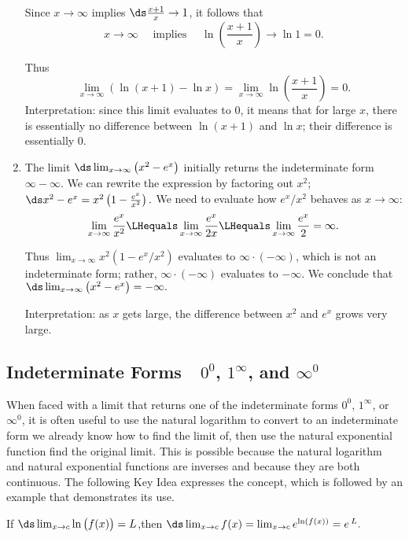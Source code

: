 \begin{example}
\begin{enumerate}
Since $x\to\infty$ implies $\ds\frac{x+1}x\to 1$, it follows that 
\[x\to\infty \quad \text{ implies }\quad \ln\left(\frac{x+1}x\right)\to\ln 1=0.\]

Thus
\[
 \lim_{x\to\infty} \left(\ln(x+1)-\ln x\right)
 = \lim_{x\to \infty} \ln \left(\frac{x+1}x\right)=0.
\]
Interpretation: since this limit evaluates to 0, it means that for large $x$, there is essentially no difference between $\ln (x+1)$ and $\ln x$; their difference is essentially 0.

	\item	The limit $\ds \lim_{x\to\infty} \left(x^2-e^x\right)$ initially returns the indeterminate form $\infty-\infty$. We can rewrite the expression by factoring out $x^2$; $\ds x^2-e^x = x^2\left(1-\frac{e^x}{x^2}\right).$ We need to evaluate how $e^x/x^2$ behaves as $x\to\infty$:
\[
\lim_{x\to\infty}\frac{e^x}{x^2} \LHequals \lim_{x\to\infty} \frac{e^x}{2x}
\LHequals \lim_{x\to\infty} \frac{e^x}{2} = \infty.
\]

Thus $\lim_{x\to\infty}x^2(1-e^x/x^2)$ evaluates to $\infty\cdot(-\infty)$, which is not an indeterminate form; rather, $\infty\cdot(-\infty)$ evaluates to $-\infty$. We conclude that 
$\ds \lim_{x\to\infty} \left(x^2-e^x\right) = -\infty.$

Interpretation: as $x$ gets large, the difference between $x^2$ and $e^x$ grows very large.
\end{enumerate}
\end{example}

\subsection{Indeterminate Forms\ \ \texorpdfstring{$0^0$, $1^\infty$, and $\infty^0$}{0\^{}0, 1\^{}∞, and ∞\^{}0}}

When faced with a limit that returns one of the indeterminate forms $0^0$, $1^\infty$, or $\infty^0$, it is often useful to use the natural logarithm to convert to an indeterminate form we already know how to find the limit of, then use the natural exponential function find the original limit. This is possible because the natural logarithm and natural exponential functions are inverses and because they are both continuous. The following Key Idea expresses the concept, which is followed by an example that demonstrates its use.

\begin{keyidea}\label{idea:LHR_power}
If $\ds \lim_{x\to c} \ln\big(f(x)\big) = L$,\quad then 
$\ds \lim_{x\to c} f(x) = \lim_{x\to c} e^{\ln(f(x))} = e\,^L.$ 
\end{keyidea}


